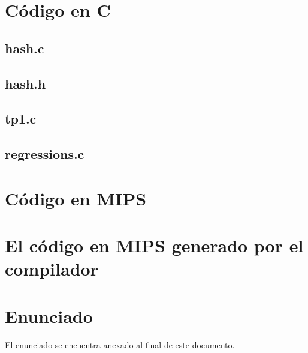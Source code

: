\documentclass[11pt,a4paper]{article}
\begin{document}
\section{Código en C}
\subsection{hash.c}

\subsection{hash.h}

\subsection{tp1.c}

\subsection{regressions.c}


\section{Código en MIPS}


\section{El código en MIPS generado por el compilador}


\section{Enunciado}
El enunciado se encuentra anexado al final de este documento.
\end{document}
